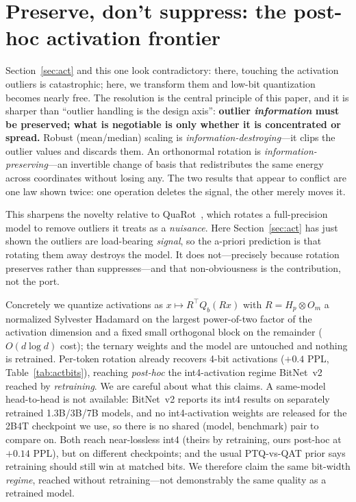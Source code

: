 \documentclass[11pt]{article}
\begin{document}
\section{Preserve, don't suppress: the post-hoc activation frontier}
\label{sec:rotate}
Section~\ref{sec:act} and this one look contradictory: there, touching the
activation outliers is catastrophic; here, we transform them and low-bit
quantization becomes nearly free. The resolution is the central principle of this
paper, and it is sharper than ``outlier handling is the design axis'':
\textbf{outlier \emph{information} must be preserved; what is negotiable is only
whether it is concentrated or spread.} Robust (mean/median) scaling is
\emph{information-destroying}---it clips the outlier values and discards them. An
orthonormal rotation is \emph{information-preserving}---an invertible change of basis
that redistributes the same energy across coordinates without losing any. The two
results that appear to conflict are one law shown twice: one operation deletes the
signal, the other merely moves it.

This sharpens the novelty relative to QuaRot~\cite{ashkboos2024quarot}, which rotates
a full-precision model to remove outliers it treats as a \emph{nuisance}. Here
Section~\ref{sec:act} has just shown the outliers are load-bearing \emph{signal}, so
the a-priori prediction is that rotating them away destroys the model. It does
not---precisely because rotation preserves rather than suppresses---and that
non-obviousness is the contribution, not the port.

Concretely we quantize activations as $x\mapsto R^\top Q_b(Rx)$ with $R =
H_p\!\otimes\!O_m$ a normalized Sylvester Hadamard on the largest power-of-two factor
of the activation dimension and a fixed small orthogonal block on the remainder
($O(d\log d)$ cost); the ternary weights and the model are untouched and nothing is
retrained. Per-token rotation already recovers 4-bit activations ($+0.4$ PPL,
Table~\ref{tab:actbits}), reaching \emph{post-hoc} the int4-activation regime
BitNet~v2~\cite{wang2025bitnetv2} reached by \emph{retraining}. We are careful about
what this claims. A same-model head-to-head is not available: BitNet~v2 reports its
int4 results on separately retrained 1.3B/3B/7B models, and no int4-activation
weights are released for the 2B4T checkpoint we use, so there is no shared
(model, benchmark) pair to compare on. Both reach near-lossless int4 (theirs by
retraining, ours post-hoc at $+0.14$ PPL), but on different checkpoints; and the
usual PTQ-vs-QAT prior says retraining should still win at matched bits. We therefore
claim the same bit-width \emph{regime}, reached without retraining---not demonstrably
the same quality as a retrained model.
\end{document}
